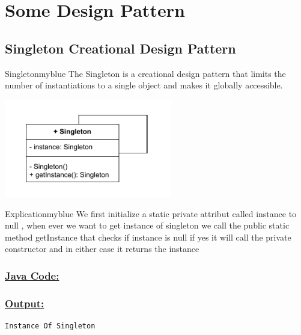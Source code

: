 \vspace{1cm}
\section{Some Design Pattern}

\subsection{Singleton Creational Design Pattern}
\begin{prettyBox}{Singleton}{myblue}
The Singleton is a creational design pattern that limits the number of instantiations to
a single object and makes it globally accessible.
\end{prettyBox}

\begin{center}
\includegraphics[width=0.55\textwidth,height=0.3\textheight]{Chapters/DesignPattern/Singleton/single.drawio.pdf}
\end{center}

\begin{prettyBox}{Explication}{myblue}
We first initialize a static private attribut called instance to null , when ever we want to get instance of singleton
we call the public static method getInstance that checks if instance is null if yes it will call the private constructor
and in either case it returns the instance 
\end{prettyBox}

\vspace{0.25cm}
\subsubsection*{\underline{Java Code:}}



\vspace{0.5cm}



\subsubsection*{\underline{Output:}}
\begin{lstlisting}[style=cmd]
Instance Of Singleton
\end{lstlisting}

